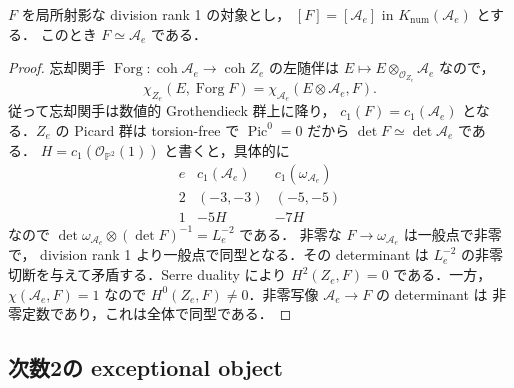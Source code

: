 \begin{lemma}
\label{lem:numerical-to-isomorphism}
$F$ を局所射影な division rank 1 の対象とし，
$[F]=[\mathcal A_e]$ in $K_{\mathrm{num}}(\mathcal A_e)$ とする．
このとき $F\simeq\mathcal A_e$ である．
\end{lemma}
\begin{proof}
忘却関手 $\operatorname{Forg}:\operatorname{coh}\mathcal A_e
\to\operatorname{coh}Z_e$ の左随伴は
$E\mapsto E\otimes_{\mathcal O_{Z_e}}\mathcal A_e$ なので，
\[
 \chi_{Z_e}(E,\operatorname{Forg}F)
 =\chi_{\mathcal A_e}(E\otimes\mathcal A_e,F).
\]
従って忘却関手は数値的 Grothendieck 群上に降り，
$c_1(F)=c_1(\mathcal A_e)$ となる．$Z_e$ の Picard 群は torsion-free で
$\operatorname{Pic}^0=0$ だから $\det F\simeq\det\mathcal A_e$ である．
$H=c_1(\mathcal O_{\mathbb P^2}(1))$ と書くと，具体的に
\[
\begin{array}{c|cc}
e&c_1(\mathcal A_e)&c_1(\omega_{\mathcal A_e})\\ \hline
2&(-3,-3)&(-5,-5)\\
1&-5H&-7H
\end{array}
\]
なので $\det\omega_{\mathcal A_e}\otimes(\det F)^{-1}=L_e^{-2}$ である．
非零な $F\to\omega_{\mathcal A_e}$ は一般点で非零で，
division rank 1 より一般点で同型となる．その determinant は
$L_e^{-2}$ の非零切断を与えて矛盾する．Serre duality により
$H^2(Z_e,F)=0$ である．一方，$\chi(\mathcal A_e,F)=1$ なので
$H^0(Z_e,F)\ne0$．非零写像 $\mathcal A_e\to F$ の determinant は
非零定数であり，これは全体で同型である．
\end{proof}

\subsection{次数2の exceptional object}

